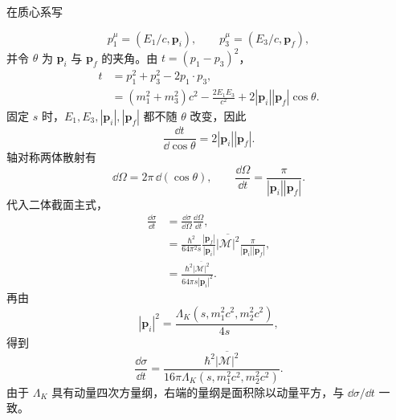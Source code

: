 \begin{derivation}[散射角与动量转移的变量变换]
在质心系写

\begin{equation*}
 p_1^\mu=(E_1/c,\mathbf p_i),
 \qquad
 p_3^\mu=(E_3/c,\mathbf p_f),
\end{equation*}
并令 $\theta$ 为 $\mathbf p_i$ 与 $\mathbf p_f$ 的夹角。由 $t=(p_1-p_3)^2$，
\begin{align*}
 t
 &=p_1^2+p_3^2-2p_1\!\cdot p_3,\\
 &=(m_1^2+m_3^2)c^2
 -\frac{2E_1E_3}{c^2}
 +2|\mathbf p_i||\mathbf p_f|\cos\theta.
 \end{align*}
固定 $s$ 时，$E_1,E_3,|\mathbf p_i|,|\mathbf p_f|$ 都不随 $\theta$ 改变，因此
\begin{equation*}
 \frac{\dd t}{\dd\cos\theta}
 =2|\mathbf p_i||\mathbf p_f|.
\end{equation*}
轴对称两体散射有
\begin{equation*}
 \dd\Omega=2\pi\,\dd(\cos\theta),
 \qquad
 \frac{\dd\Omega}{\dd t}
 =\frac{\pi}{|\mathbf p_i||\mathbf p_f|}.
\end{equation*}
代入二体截面主式，
\begin{align*}
 \frac{\dd\sigma}{\dd t}
 &=\frac{\dd\sigma}{\dd\Omega}
 \frac{\dd\Omega}{\dd t},\\
 &=\frac{\hbar^2}{64\pi^2s}
 \frac{|\mathbf p_f|}{|\mathbf p_i|}
 \overline{|\mathcal M|^2}
 \frac{\pi}{|\mathbf p_i||\mathbf p_f|},\\
 &=\frac{\hbar^2\overline{|\mathcal M|^2}}
 {64\pi s|\mathbf p_i|^2}.
\end{align*}
再由 
\begin{equation*}
 |\mathbf p_i|^2
 =\frac{\Lambda_K(s,m_1^2c^2,m_2^2c^2)}{4s},
\end{equation*}
得到
\begin{equation*}
 {
 \frac{\dd\sigma}{\dd t}
 =\frac{\hbar^2\overline{|\mathcal M|^2}}
 {16\pi\Lambda_K(s,m_1^2c^2,m_2^2c^2)}.}
 \end{equation*}
由于 $\Lambda_K$ 具有动量四次方量纲，右端的量纲是面积除以动量平方，与 $\dd\sigma/\dd t$ 一致。
\end{derivation}

